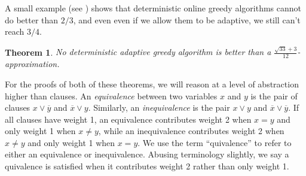 \documentclass[11pt,letter]{article}
\newtheorem{theorem}{Theorem}
\numberwithin{theorem}{section}
\newcommand{\ol}{\overline}
\begin{document}
A small example (see \cite{DBLP:conf/esa/Poloczek11}) shows that
deterministic online greedy algorithms cannot do better than $2/3$,
and even even if we allow them to be adaptive, we still can't reach $3/4$.

\begin{theorem}\label{theorem:greedyDeterministic}
  No deterministic adaptive greedy algorithm
  is better than a $\frac{\sqrt{33} + 3}{12}$-approximation.
\end{theorem}

For the proofs of both of these theorems,
we will reason at a level of abstraction higher than clauses.
An \emph{equivalence} between two variables $x$ and $y$
is the pair of clauses $x \lor \ol{y}$ and $\ol{x} \lor y$.
Similarly, an \emph{inequivalence} is
the pair $x \lor y$ and $\ol{x} \lor \ol{y}$.
If all clauses have weight 1,
an equivalence contributes weight 2 when $x = y$
and only weight 1 when $x \neq y$,
while an inequivalence contributes weight 2 when $x \neq y$
and only weight 1 when $x = y$.
We use the term ``quivalence''
to refer to either an equivalence or inequivalence.
Abusing terminology slightly, we say a quivalence is satisfied
when it contributes weight 2 rather than only weight 1.
\end{document}
